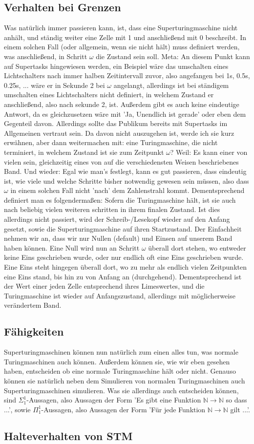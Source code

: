 \documentclass{scrartcl}
\begin{document}
\subsection{Verhalten bei Grenzen}
Was natürlich immer passieren kann, ist, dass eine Superturingmaschine nicht
anhält, und ständig weiter eine Zelle mit 1 und anschließend mit 0 beschreibt.
In einem solchen Fall (oder allgemein, wenn sie nicht hält) muss definiert
werden, was anschließend, in Schritt $\omega$ die Zustand sein soll. Meta: An
diesem Punkt kann auf Supertasks hingewiesen werden, ein Beispiel wäre das
umschalten eines Lichtschalters nach immer halben Zeitintervall zuvor, also
angefangen bei 1s, 0.5s, 0.25s, ... wäre er in Sekunde 2 bei $\omega$
angelangt, allerdings ist bei ständigem umschalten eines Lichtschalters nicht
definiert, in welchem Zustand er anschließend, also nach sekunde 2, ist.
Außerdem gibt es auch keine eindeutige Antwort, da es gleichzusetzen wäre mit
'Ja, Unendlich ist gerade' oder eben dem Gegenteil davon. Allerdings sollte das
Publikum bereits mit Supertasks im Allgemeinen vertraut sein. Da davon nicht
auszugehen ist, werde ich sie kurz erwähnen, aber dann weitermachen mit: eine
Turingmaschine, die nicht terminiert, in welchem Zustand ist sie zum Zeitpunkt
$\omega$? Weil: Es kann einer von vielen sein, gleichzeitig eines von auf die
verschiedensten Weisen beschriebenes Band. Und wieder: Egal wie man's festlegt,
kann es gut passieren, dass eindeutig ist, wie viele und welche Schritte bisher
notwendig gewesen sein müssen, also dass $\omega$ in einem solchen Fall nicht
'nach' dem Zahlenstrahl kommt. Dementsprechend definiert man es folgendermaßen:
Sofern die Turingmaschine hält, ist sie auch nach beliebig vielen weiteren
schritten in ihrem finalen Zustand. Ist dies allerdings nicht passiert, wird
der Schreib-/Lesekopf wieder auf den Anfang gesetzt, sowie die
Superturingmaschine auf ihren Startzustand. Der Einfachheit nehmen wir an, dass
wir nur Nullen (default) und Einsen auf unserem Band haben können. Eine Null
wird nun an Schritt $\omega$ überall dort stehen, wo entweder keine Eins
geschrieben wurde, oder nur endlich oft eine Eins geschrieben wurde. Eine Eins
steht hingegen überall dort, wo zu mehr als endlich vielen Zeitpunkten eine
Eins stand, bis hin zu von Anfang an (durchgehend). Dementsprechend ist der
Wert einer jeden Zelle entsprechend ihres Limeswertes, und die Turingmaschine
ist wieder auf Anfangszustand, allerdings mit möglicherweise verändertem Band.

\subsection{Fähigkeiten}
Superturingmaschinen können nun natürlich zum einen alles tun, was normale
Turingmaschinen auch können. Außerdem können sie, wie wir eben gesehen haben,
entscheiden ob eine normale Turingmaschine hält oder nicht. Genauso können sie
natürlich neben dem Simulieren von normalen Turingmaschinen auch
Superturingmaschinen simulieren. Was sie allerdings auch entscheiden können,
sind $\Sigma_1^1$-Aussagen, also Aussagen der Form 'Es gibt eine Funktion
$\mathbb{N} \rightarrow \mathbb{N}$ so dass ...', sowie $\Pi^1_1$-Aussagen,
also Aussagen der Form 'Für jede Funktion $\mathbb{N} \rightarrow \mathbb{N}$
gilt ...'. 


\subsection{Halteverhalten von STM}
\end{document}
